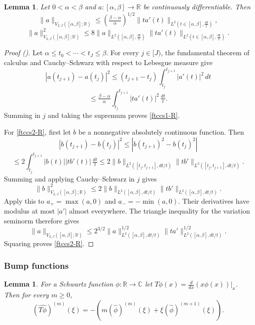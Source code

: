\documentclass[12pt,reqno]{amsart}
\newcommand{\auto}{{({\tiny\faCar})}}
\theoremstyle{plain}
\newtheorem{lemma}[theorem]{Lemma}
\numberwithin{equation}{section}
\theoremstyle{remark}
\newcommand{\R}{{\mathbb R}}
\begin{document}
\begin{lemma}\label{lem:ftccs-R}   Let $0<\alpha < \beta$ and $a:[\alpha,\beta]\to \R$ be continuously differentiable.
    Then
\begin{equation}\label{ftccs1-R}
\|a\|_{V_{2,J}([\alpha, \beta]; \R)} \le (\tfrac{\beta-\alpha}{\alpha})^{1/2} \|ta'(t)\|_{L^2(t\in [\alpha, \beta],\tfrac{dt}{t})}, \end{equation}
\begin{equation}\label{ftccs2-R}
\|a\|_{V_{2,J}([\alpha, \beta]; \R)}^2 \le 8 \|a\|_{L^2([\alpha, \beta],\tfrac{dt}{t})}\|ta'(t)\|_{L^2(t\in [\alpha, \beta],\tfrac{dt}{t})}.
\end{equation}
\end{lemma}
\begin{proof}[Proof \auto]
Let $\alpha\le t_0<\cdots<t_J\le\beta$. For every $j\in[J)$, the fundamental theorem of calculus and Cauchy--Schwarz with respect to Lebesgue measure give
\[
|a(t_{j+1})-a(t_j)|^2
\le
(t_{j+1}-t_j)\int_{t_j}^{t_{j+1}}|a'(t)|^2\,dt
\]
\[
\le
\tfrac{\beta-\alpha}{\alpha}
\int_{t_j}^{t_{j+1}}|ta'(t)|^2\,\tfrac{dt}{t}.
\]
Summing in $j$ and taking the supremum proves \eqref{ftccs1-R}.

For \eqref{ftccs2-R}, first let $b$ be a nonnegative absolutely continuous function. Then
\[
|b(t_{j+1})-b(t_j)|^2
\le
|b(t_{j+1})^2-b(t_j)^2|
\]
\[
\le
2\int_{t_j}^{t_{j+1}}|b(t)||tb'(t)|\,\tfrac{dt}{t}
\le
2\|b\|_{L^2([t_j,t_{j+1}],dt/t)}
\|tb'\|_{L^2([t_j,t_{j+1}],dt/t)}.
\]
Summing and applying Cauchy--Schwarz in $j$ gives
\[
\|b\|_{V_{2,J}([\alpha,\beta];\R)}^2
\le
2\|b\|_{L^2([\alpha,\beta],dt/t)}
\|tb'\|_{L^2([\alpha,\beta],dt/t)}.
\]
Apply this to $a_+=\max(a,0)$ and $a_-=-\min(a,0)$. Their derivatives have modulus at most $|a'|$ almost everywhere. The triangle inequality for the variation seminorm therefore gives
\[
\|a\|_{V_{2,J}([\alpha,\beta];\R)}
\le
2^{3/2}\|a\|_{L^2([\alpha,\beta],dt/t)}^{1/2}
\|ta'\|_{L^2([\alpha,\beta],dt/t)}^{1/2}.
\]
Squaring proves \eqref{ftccs2-R}.
\end{proof}

\subsubsection{Bump functions}\label{sec:bump red}

\begin{lemma}\label{lem:ft_deriv_mul}
For a Schwartz function $\phi:\mathbb{R}\to\mathbb{C}$ let
$T\phi(x)=\frac{d}{dx} (x \phi(x))|_x$. Then
for every $m\ge 0$,
\begin{equation}\label{auto:Fourier-derivatives-of-T}(\widehat{T\phi})^{(m)}(\xi) = -(m (\widehat{\phi})^{(m)}(\xi) + \xi (\widehat{\phi})^{(m+1)}(\xi)).\end{equation}
\end{lemma}
\end{document}

